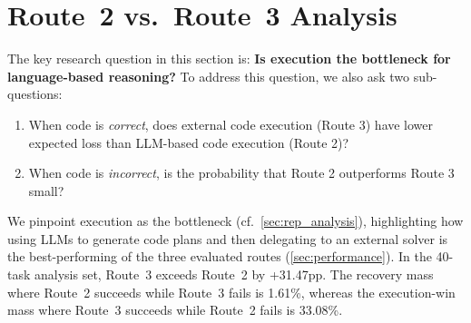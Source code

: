 




\section{Route~2 vs.\ Route~3 Analysis}
\label{sec:route2v3}
The key research question in this section is: \textbf{Is execution the bottleneck for language-based reasoning?}
To address this question, we also ask two sub-questions:
\begin{enumerate}
    \item[1)] When code is \emph{correct}, does external code execution (Route 3) have lower expected loss than LLM-based code execution (Route 2)?
    \item[2)] When code is \emph{incorrect}, is the probability that Route 2 outperforms Route 3 small?
\end{enumerate}
We pinpoint execution as the bottleneck (cf.\ \cref{sec:rep_analysis}), highlighting how using LLMs to generate code plans and then delegating to an external solver is the best-performing of the three evaluated routes (\cref{sec:performance}). In the 40-task analysis set, Route~3 exceeds Route~2 by +31.47pp. The recovery mass where Route~2 succeeds while Route~3 fails is 1.61\%, whereas the execution-win mass where Route~3 succeeds while Route~2 fails is 33.08\%.

